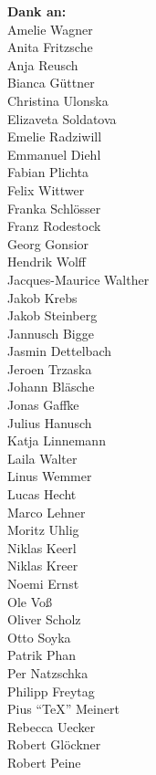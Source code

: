 \begin{minipage}[t][\textheight][b]{.25\textwidth}
\fontsize{6pt}{7.2pt}\selectfont
\raggedleft
\textbf{Dank an:}\\[1\baselineskip]
Amelie Wagner\\
Anita Fritzsche\\
Anja Reusch\\
Bianca Güttner\\
Christina Ulonska\\
Elizaveta Soldatova\\
Emelie Radziwill\\
Emmanuel Diehl\\
Fabian Plichta\\
Felix Wittwer\\
Franka Schlösser\\
Franz Rodestock\\
Georg Gonsior\\
Hendrik Wolff\\
Jacques-Maurice Walther\\
Jakob Krebs\\
Jakob Steinberg\\
Jannusch Bigge\\
Jasmin Dettelbach\\
Jeroen Trzaska\\
Johann Bläsche\\
Jonas Gaffke\\
Julius Hanusch\\
Katja Linnemann\\
Laila Walter\\
Linus Wemmer\\
Lucas Hecht\\
Marco Lehner\\
Moritz Uhlig\\
Niklas Keerl\\
Niklas Kreer\\
Noemi Ernst\\
Ole Voß\\
Oliver Scholz\\
Otto Soyka\\
Patrik Phan\\
Per Natzschka\\
Philipp Freytag\\
Pius \foreignlanguage{english}{\enquote{\TeX}} Meinert\\
Rebecca Uecker\\
Robert Glöckner\\
Robert Peine\\

\end{minipage}

